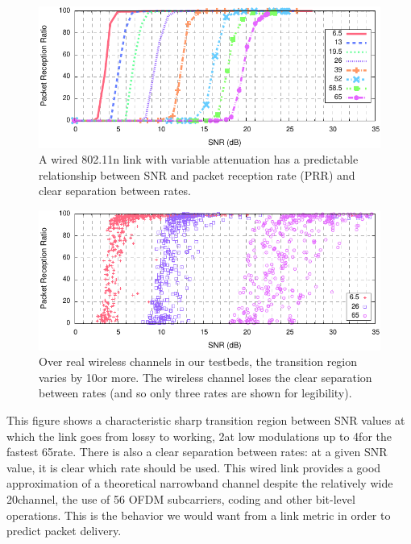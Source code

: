 \begin{figure}[t!]
	\centering
	\includegraphics[width=\textwidth]{figures/snr_prr_atten.pdf}
	\caption{\label{fig:snr_prr_attenuator}A wired 802.11n link with variable attenuation has a predictable relationship between SNR and packet reception rate (PRR) and clear separation between rates.}
\end{figure}
\begin{figure}[t!]
	\centering
	\includegraphics[width=\textwidth]{figures/snr_prr_scatter.pdf}
	\caption{\label{fig:snr_prr_26_65} Over real wireless channels in our testbeds, the transition region varies by 10\dB or more. The wireless channel loses the clear separation between rates (and so only three rates are shown for legibility).}%
\end{figure}

This figure shows a characteristic sharp transition region between SNR values at which the link goes from lossy to working, 2\dB at low modulations up to 4\dB for the fastest 65\Mbps rate. There is also a clear separation between rates: at a given SNR value, it is clear which rate should be used. This wired link provides a good approximation of a theoretical narrowband channel despite the relatively wide 20\MHz channel, the use of 56 OFDM subcarriers, coding and other bit-level operations. This is the behavior we would want from a link metric in order to predict packet delivery.

